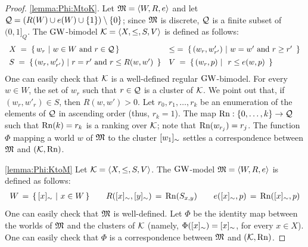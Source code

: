 \begin{proof}
  \ref{lemma:Phi:MtoK}. Let $\mathfrak{M}=\langle W,R,e \rangle$ and let
  $\mathcal{Q} = (R(W)\cup e(W) \cup \{1\}) \setminus \{0\}$; since $\mathfrak{M}$ is discrete, $\mathcal{Q}$ is a
finite subset of $(0,1]_Q$.  The $\mbox{$\mathrm{GW}$}$-bimodel $\mathcal{K}=\langle X,\leq,S,V \rangle$
is defined as follows:
\[
  \begin{array}{ll}
    X\;=\;\{\, w_r~|~ \text{$w\in W$ and $r\in \mathcal{Q}$}\,\}
&    
\leq \;=\; \{\, (w_r, w'_{r'})~|~\text{$w = w'$ and $r \geq r'$ }  \,\}    
\\[1ex]
    S \;=\; \{\, (w_r, w'_{r'})~|~\text{$r = r'$ and $r \leq R(w,w')$ }  \,\}
&
V \;=\; \{\, (w_r, p)~|~\text{ $r \leq e(w,p)$ }  \,\}
\end{array}
\]
    One can easily  check that $\mathcal{K}$ is a  well-defined regular $\mbox{$\mathrm{GW}$}$-bimodel.
    For every $w\in W$, the set of  $w_r$ such that $r\in \mathcal{Q}$ is a cluster of $\mathcal{K}$.
    We point out that, if  $(w_r, w'_r)\in S$, then $R(w,w') > 0$.
    Let  $r_0,r_1, \dots, r_{k}$ be an enumeration of the elements of $\mathcal{Q}$ in ascending order
    (thus, $r_k=1$).
   The map $\mathrm{Rn} : \{0,\dots,k\}\to\mathcal{Q}$
    such that $\mathrm{Rn}(k) = r_k$ is a ranking over $\mathcal{K}$;  note that $\mathrm{Rn}(w_{r_j})=r_j$.
    The function $\Phi$ mapping a world $w$ of $\mathfrak{M}$ to the cluster
    $[w_1]_\sim$ settles a correspondence between $\mathfrak{M}$ and  $(\mathcal{K},\mathrm{Rn})$. 

    \smallskip
    \noindent
   \ref{lemma:Phi:KtoM}
   Let  $\mathcal{K}=\langle X,\leq,S,V \rangle$.
   The  $\mbox{$\mathrm{GW}$}$-model  $\mathfrak{M}=\langle W,R,e \rangle$ is defined as follows:
   \[
     \begin{array}{l}
W\,=\,\{\, [x]_\sim~|~x\in W   \,\}
       \qquad
       R([x]_\sim,  [y]_\sim) \,=\, \mathrm{Rn}(S_{x,y})
\qquad
e([x]_\sim,p)\,=\, \mathrm{Rn}([x]_\sim,p)
     \end{array}
\]
One can easily check that $\mathfrak{M}$ is well-defined.  Let $\Phi$ be the identity map
between the worlds of $\mathfrak{M}$ and the clusters of $\mathcal{K}$ 
(namely, $\Phi([x]_\sim)=[x]_\sim$, for every $x\in X$).
One can easily check that   $\Phi$
   is  a correspondence between $\mathfrak{M}$ and  $(\mathcal{K},\mathrm{Rn})$. 
 \end{proof}



